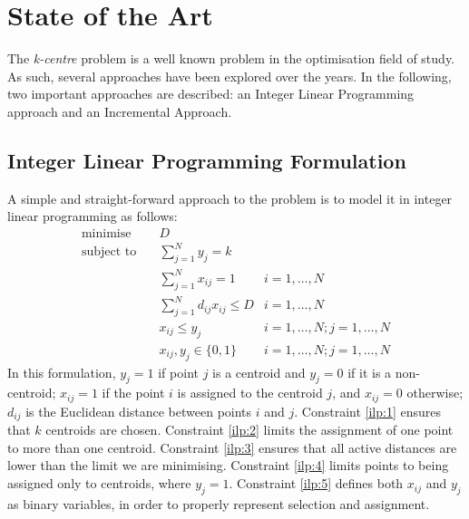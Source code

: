 \chapter{State of the Art}
\label{chap:sota}

The \emph{k-centre} problem is a well known problem in the optimisation field of study. As such, several approaches have been explored over the years. In the following, two important approaches are described: an Integer Linear Programming approach and an Incremental Approach.

\section{Integer Linear Programming Formulation}
\label{alg:ilp}

A simple and straight-forward approach to the problem is to model it in  integer linear programming as follows:
\begin{align}
\text{minimise}   \quad& D							   &\\
\text{subject to} \quad
& \sum\limits_{j=1}^{N}{y_j} = k 
& 							\label{ilp:1}\\
& \sum\limits_{j=1}^{N}{x_{ij}}	= 1   
& i=1,\ldots,N 				\label{ilp:2}\\
& \sum\limits_{j=1}^{N}{d_{ij} x_{ij}} \leq D
& i=1,\ldots,N				\label{ilp:3}\\
& x_{ij} \leq y_{j}				   
& i=1,\ldots,N;j=1,\ldots,N	\label{ilp:4}\\
& x_{ij},y_{j} \in \{0,1\}
& i=1,\ldots,N;j=1,\ldots,N \label{ilp:5}
\end{align}
In this formulation, $y_j = 1$ if point $j$ is a centroid and $y_j = 0$ if it is a non-centroid;
$x_{ij} = 1$ if the point $i$ is assigned to the centroid $j$, and $x_{ij}=0$ otherwise;
$d_{ij}$ is the Euclidean distance between points $i$ and $j$.
Constraint \eqref{ilp:1} ensures that $k$ centroids are chosen.
Constraint \eqref{ilp:2} limits the assignment of one point to more than one centroid.
Constraint \eqref{ilp:3} ensures that all active distances are lower than the limit we are minimising.
Constraint \eqref{ilp:4} limits points to being assigned only to centroids, where $y_j=1$.
Constraint \eqref{ilp:5} defines both $x_{ij}$ and $y_j$ as binary variables, in order to properly represent selection and assignment.

